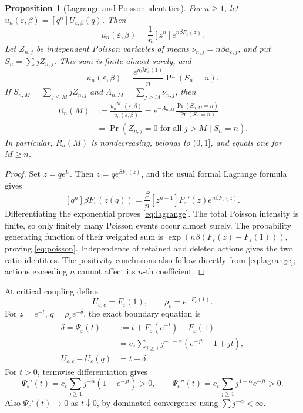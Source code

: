 \documentclass[11pt,a4paper]{article}
\numberwithin{equation}{section}
\newtheorem{proposition}[theorem]{Proposition}
\theoremstyle{definition}
\theoremstyle{remark}
\newcommand{\eps}{\varepsilon}
\begin{document}
\begin{proposition}[Lagrange and Poisson identities]
\label{prop:lagrange}
For \(n\ge1\), let \(u_n(\eps,\beta)=[q^n]U_{\eps,\beta}(q)\). Then
\begin{equation}
 u_n(\eps,\beta)=\frac1n[z^n]e^{n\beta F_\eps(z)}.
 \label{eq:lagrange}
\end{equation}
Let \(Z_{n,j}\) be independent Poisson variables of means
\(\nu_{n,j}=n\beta a_{\eps,j}\), and put
\(S_n=\sum jZ_{n,j}\). This sum is finite almost surely, and
\begin{equation}
 u_n(\eps,\beta)=\frac{e^{n\beta F_\eps(1)}}n\Pr(S_n=n).
 \label{eq:poisson}
\end{equation}
If \(S_{n,M}=\sum_{j\le M}jZ_{n,j}\) and
\(\Lambda_{n,M}=\sum_{j>M}\nu_{n,j}\), then
\begin{align}
 R_n(M)&:=\frac{u_n^{[M]}(\eps,\beta)}{u_n(\eps,\beta)}
 =e^{-\Lambda_{n,M}}\frac{\Pr(S_{n,M}=n)}{\Pr(S_n=n)} \label{eq:cutoff-identity}\\
 &=\Pr(Z_{n,j}=0\text{ for all }j>M\mid S_n=n).
 \label{eq:conditional-cutoff}
\end{align}
In particular, \(R_n(M)\) is nondecreasing, belongs to \((0,1]\), and equals
one for \(M\ge n\).
\end{proposition}
\begin{proof}
Set \(z=qe^U\). Then \(z=qe^{\beta F_\eps(z)}\), and the usual formal
Lagrange formula gives
\[
 [q^n]\beta F_\eps(z(q))=
 \frac\beta n[z^{n-1}]F_\eps'(z)e^{n\beta F_\eps(z)}.
\]
Differentiating the exponential proves \eqref{eq:lagrange}. The total Poisson
intensity is finite, so only finitely many Poisson events occur almost surely.
The probability generating function of their weighted sum is
\(\exp(n\beta(F_\eps(z)-F_\eps(1)))\), proving \eqref{eq:poisson}.
Independence of retained and deleted actions gives the two ratio identities.
The positivity conclusions also follow directly from
\eqref{eq:lagrange}; actions exceeding \(n\) cannot affect its \(n\)-th
coefficient.
\end{proof}

At critical coupling define
\begin{equation}
 U_{\eps,c}=F_\eps(1),\qquad
 \rho_\eps=e^{-F_\eps(1)}.
 \label{eq:critical}
\end{equation}
For \(z=e^{-t}\), \(q=\rho_\eps e^{-\delta}\), the exact boundary equation is
\begin{align}
 \delta=\Psi_\eps(t)
 &:=t+F_\eps(e^{-t})-F_\eps(1) \label{eq:psi}\\
 &=c_\eps\sum_{j\ge1}j^{-1-\alpha}
       (e^{-jt}-1+jt), \nonumber\\
 U_{\eps,c}-U_\eps(q)&=t-\delta. \label{eq:udisplacement}
\end{align}
For \(t>0\), termwise differentiation gives
\begin{equation}
 \Psi_\eps'(t)=c_\eps\sum_{j\ge1}j^{-\alpha}(1-e^{-jt})>0,
 \qquad
 \Psi_\eps''(t)=c_\eps\sum_{j\ge1}j^{1-\alpha}e^{-jt}>0.
 \label{eq:psi-derivatives}
\end{equation}
Also \(\Psi_\eps'(t)\to0\) as \(t\downarrow0\), by dominated convergence
using \(\sum j^{-\alpha}<\infty\).
\end{document}
